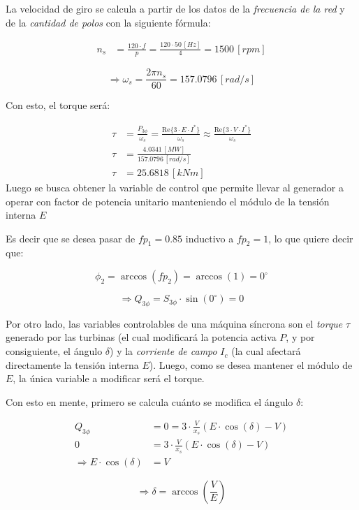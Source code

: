 \documentclass[
  11pt,
  letterpaper,
   addpoints,
   answers
  ]{exam}
\begin{document}
\begin{questions}
\begin{solution}
    La velocidad de giro se calcula a partir de los datos de la \textit{frecuencia de la red} y de la \textit{cantidad de polos} con la siguiente fórmula:

\begin{align}
n_s &= \frac{120 \cdot f}{p} = \frac{120 \cdot 50 \, [Hz]}{4} = 1500 \, [rpm]
\end{align}

\[
\Rightarrow \omega_s = \frac{2 \pi n_s}{60} = 157.0796 \, [rad/s]
\]

Con esto, el torque será:

\begin{align}
\tau &= \frac{P_{3\phi}}{\omega_s} = \frac{\text{Re}\{ 3 \cdot E \cdot I^* \}}{\omega_s} \approx \frac{\text{Re}\{ 3 \cdot V \cdot I^* \}}{\omega_s} \\
\tau &= \frac{4.0341 \, [MW]}{157.0796 \, [rad/s]} \\
\tau &= 25.6818 \, [kNm]
\end{align}
Luego se busca obtener la variable de control que  permite llevar al generador a operar con factor de potencia unitario manteniendo el módulo de la tensión interna \(E\)

Es decir que se desea pasar de \(fp_1 = 0.85\) inductivo a \(fp_2 = 1\), lo que quiere decir que:

\[
\phi_2 = \arccos(fp_2) = \arccos(1) = 0^\circ
\]

\[
\Rightarrow Q_{3\phi} = S_{3\phi} \cdot \sin(0^\circ) = 0
\]

Por otro lado, las variables controlables de una máquina síncrona son el \textit{torque} \(\tau\) generado por las turbinas (el cual modificará la potencia activa \(P\), y por consiguiente, el ángulo \(\delta\)) y la \textit{corriente de campo} \(I_c\) (la cual afectará directamente la tensión interna \(E\)). Luego, como se desea mantener el módulo de \(E\), la única variable a modificar será el torque.

Con esto en mente, primero se calcula cuánto se modifica el ángulo \(\delta\):

\begin{align}
Q_{3\phi} &= 0 = 3 \cdot \frac{V}{x_s} \left( E \cdot \cos(\delta) - V \right) \\
0 &= 3 \cdot \frac{V}{x_s} \left( E \cdot \cos(\delta) - V \right) \\
\Rightarrow E \cdot \cos(\delta) &= V
\end{align}

\[
\Rightarrow \delta = \arccos \left( \frac{V}{E} \right)
\]


\end{solution}
\end{questions}
\end{document}
